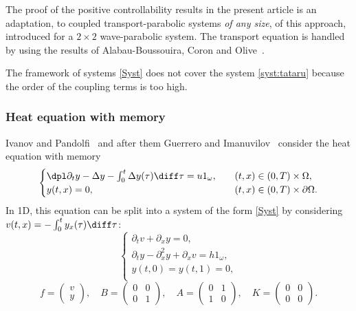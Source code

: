 The proof of the positive controllability results in the present article is an adaptation, to coupled transport-parabolic systems \emph{of any size}, of this approach, introduced for a $2\times2$ wave-parabolic system. The transport equation is handled by using the results of Alabau-Boussouira, Coron and Olive~\cite{alabau-boussouira_2017}.

The framework of systems \eqref{Syst} does not cover the system \eqref{syst:tataru} because the order of the coupling terms is too high.

\subsubsection{Heat equation with memory}
Ivanov and Pandolfi~\cite{ivanov_2009} and after them Guerrero and Imanuvilov~\cite{guerrero_2013} consider the heat equation with memory
\begin{equation} \label{chaleur_mem}
\begin{cases}
\dpl\partial_t y - \Delta y - \int_0^t \Delta y (\tau) \diff \tau = u 1_\omega, \quad & (t,x)\in(0,T)\times\Omega, \\
y(t,x)=0, & (t,x)\in(0,T)\times\partial\Omega.
\end{cases}
\end{equation}
In 1D, this equation can be split into a system of the form \eqref{Syst} by considering $v(t,x)=-\int_0^t y_x(\tau) \diff \tau$:
\begin{equation} \label{chaleur_mem_syst}
\begin{cases}
\partial_t v +\partial_x y = 0, \\
\partial_t y - \partial_x^2 y + \partial_xv = h 1_{\omega}, \\
y(t,0)=y(t,1)=0, \\
\end{cases}
\end{equation}
\ie
\[
f=\begin{pmatrix}
v \\ y
\end{pmatrix}, \quad
B=\begin{pmatrix}
0 & 0 \\ 0 & 1
\end{pmatrix}, \quad
A=\begin{pmatrix}
0 & 1 \\ 1 & 0
\end{pmatrix}, \quad
K=\begin{pmatrix}
0 & 0 \\ 0 & 0
\end{pmatrix}.
\]


